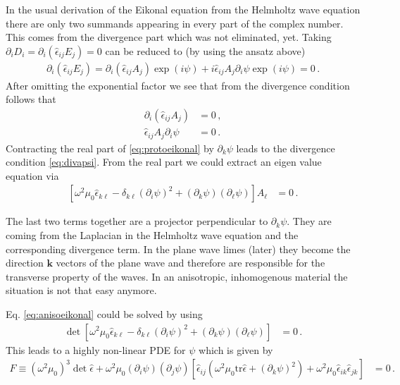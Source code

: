 \documentclass[12pt,a4paper,twoside,openright,BCOR10mm,headsepline,titlepage,abstracton,chapterprefix,final]{scrreprt}
\newcommand\Vector[1]{{\mathbf{#1}}}
\newcommand\Tensor[1]{\hat{#1}}
\newcommand\permittivity{\Tensor{\epsilon}}
\begin{document}
In the usual derivation of the Eikonal equation
from the Helmholtz wave equation there are only
two summands appearing in every part of the complex number.
This comes from the divergence part which was not eliminated, yet.
Taking $\partial_i D_i = \partial_i (\permittivity_{ij} E_j) = 0$ can be
reduced to (by using the ansatz above)
\begin{align}
 \partial_i (\permittivity_{ij} E_j) = \partial_i (\permittivity_{ij} A_j) \exp(i \psi) + i \permittivity_{ij} A_j \partial_i \psi \exp(i \psi) = 0\,.
\end{align}
After omitting the exponential factor we see that from the divergence condition follows that
\begin{align}
 \partial_i (\permittivity_{ij} A_j) &= 0\,,\label{eq:divaeps}\\
 \permittivity_{ij} A_j \partial_i \psi &= 0\,.\label{eq:divapsi}
\end{align}
Contracting the real part of \eqref{eq:protoeikonal} by $\partial_k \psi$ leads to the divergence condition \eqref{eq:divapsi}.
From the real part we could extract an eigen value equation via
\begin{align}
 \left[\omega^2 \mu_0 \permittivity_{k\ell} - \delta_{k\ell} (\partial_i \psi)^2 + (\partial_k \psi)(\partial_\ell \psi)\right] A_\ell  &= 0 \label{eq:anisoeikonal}\,.
\end{align}

The last two terms together are a projector perpendicular to $\partial_k \psi$. They are coming from
the Laplacian in the Helmholtz wave equation and the corresponding divergence term. In the plane wave limes (later)
they become the direction $\Vector{k}$ vectors of the plane wave and therefore are responsible for the transverse
property of the waves. In an anisotropic, inhomogenous material the situation is not that easy anymore.

Eq. \eqref{eq:anisoeikonal} could be solved by using
\begin{align}
 \det  \left[\omega^2 \mu_0 \permittivity_{k\ell} - \delta_{k\ell} (\partial_i \psi)^2 + (\partial_k \psi)(\partial_\ell \psi)\right] &= 0\,.
\end{align}
This leads to a highly non-linear PDE for $\psi$ which is given by
\begin{align}
 F\equiv(\omega^2 \mu_0)^3 \det \permittivity + \omega^2 \mu_0 (\partial_i \psi)(\partial_j \psi)\left[\permittivity_{ij} (\omega^2 \mu_0 \text{tr}\permittivity + (\partial_k \psi)^2) + \omega^2 \mu_0 \permittivity_{ik} \permittivity_{jk}\right] &= 0\,.
\end{align}
\end{document}
